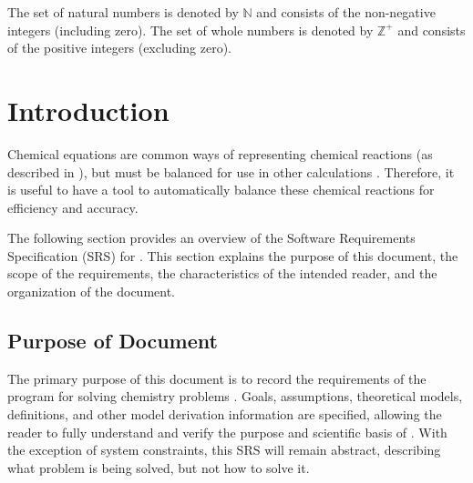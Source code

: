 \documentclass[12pt]{article}
\begin{document}
The set of natural numbers is denoted by $\mathbb{N}$ and consists of the
non-negative integers (including zero). The set of whole numbers is denoted by
$\mathbb{Z}^+$ and consists of the positive integers (excluding zero).


\newpage



\section{Introduction} \label{sec_intro}
Chemical equations are common ways of representing chemical reactions (as
described in ), but must be balanced for use in other
calculations \cite{lund_introduction_2023}. Therefore, it is useful to have a
tool to automatically balance these chemical reactions for efficiency and
accuracy.

The following section provides an overview of the Software Requirements
Specification (SRS) for \progname{}. This section explains the purpose of this
document, the scope of the requirements, the characteristics of the intended
reader, and the organization of the document.

\subsection{Purpose of Document}

The primary purpose of this document is to record the requirements of the
program for solving chemistry problems .
Goals, assumptions, theoretical models,
definitions, and other model derivation information are specified, allowing the
reader to fully understand and verify the purpose and scientific basis of
\progname{}. With the exception of system constraints, this SRS will remain
abstract, describing what problem is being solved, but not how to solve it.
\end{document}
